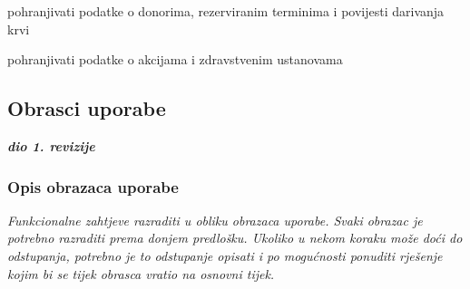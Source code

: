 \begin{packed_enum}
\begin{packed_enum}
				\end{packed_enum}

				\item  {}

				\begin{packed_enum}

					\item pohranjivati podatke o donorima, rezerviranim terminima i povijesti darivanja krvi
					\item pohranjivati podatke o akcijama i zdravstvenim ustanovama

				\end{packed_enum}

			\end{packed_enum}
			
			\eject 
			
			
				
			\subsection{Obrasci uporabe}
				
				\textbf{\textit{dio 1. revizije}}
				
				\subsubsection{Opis obrazaca uporabe}
					\textit{Funkcionalne zahtjeve razraditi u obliku obrazaca uporabe. Svaki obrazac je potrebno razraditi prema donjem predlošku. Ukoliko u nekom koraku može doći do odstupanja, potrebno je to odstupanje opisati i po mogućnosti ponuditi rješenje kojim bi se tijek obrasca vratio na osnovni tijek.}\\
					

